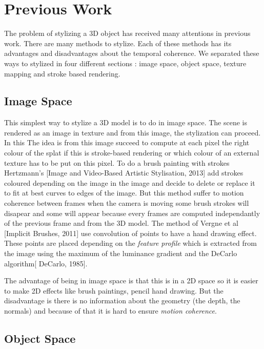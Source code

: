 \chapter{Previous Work}



The problem of stylizing a 3D object has received many attentions in previous work. There are many methods to stylize. Each of these methods has its advantages and disadvantages about the temporal coherence. We separated these ways to stylized in four different sections : image space, object space, texture mapping and stroke based rendering.


\section{Image Space}

This simplest way to stylize a 3D model is to do in image space. The scene is rendered as an image in texture and from this image, the stylization can proceed. In this
The idea is from this image succeed to compute at each pixel the right colour of the splat if this is stroke-based rendering or which colour of an external texture has to be put on this pixel.
To do a brush painting with strokes Hertzmann's [Image and Video-Based Artistic Stylisation, 2013] add strokes coloured depending on the image in the image and decide to delete or replace it to fit at best curves to edges of the image. But this method suffer to motion coherence between frames when the camera is moving some brush strokes will disapear and some will appear because every frames are computed independantly of the previous frame and from the 3D model.
The method of Vergne et al [Implicit Brushes, 2011] use convolution of points to have a hand drawing effect. These points are placed depending on the \textit{feature profile} which is extracted from the image using the maximum of the luminance gradient and the DeCarlo algorithm[ DeCarlo, 1985].

The advantage of being in image space is that this is in a 2D space so it is easier to make 2D effects like brush paintings, pencil hand drawing. But the disadvantage is there is no information about the geometry (the depth, the normals) and because of that it is hard to ensure \textit{motion coherence}.

\section{Object Space}


